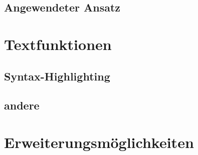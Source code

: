 \documentclass[10pt]{article}
\begin{document}
	
	\pagebreak
	\subsection{Angewendeter Ansatz}
	\pagebreak
	\section{Textfunktionen}
	\subsection{Syntax-Highlighting}
	\subsection{andere}
	\pagebreak
	\section{Erweiterungsmöglichkeiten}
	\pagebreak
	\listoffigures
	
	
\end{document}

